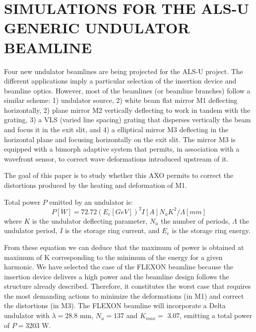 \documentclass[]{spie}  %
\begin{document}
\section{SIMULATIONS FOR THE ALS-U GENERIC UNDULATOR BEAMLINE}
Four new undulator beamlines are being projected for the ALS-U project. The different applications imply a particular selection of the insertion device and beamline optics. However, most of the beamlines (or beamline branches) follow a similar scheme: 1) undulator source, 2) white beam flat mirror M1 deflecting horizontally, 2) plane mirror M2 vertically deflecting to work in tandem with the grating, 3) a VLS (varied line spacing) grating that disperses vertically the beam and focus it in the exit slit, and 4) a elliptical mirror M3 deflecting in the horizontal plane and focusing horizontally on the exit slit. The mirror M3 is equipped with a bimorph adaptive system that permits, in association with a wavefront sensor, to correct wave deformations introduced upstream of it.

The goal of this paper is to study whether this AXO permits to correct the distortions produced by the heating and deformation of M1.

Total power $P$ emitted by an undulator is: 
\begin{equation}
    P [W] = 72.72  (E_e [GeV])^2  I[A]  N_u  K^2 / \Lambda[mm]
\end{equation}
where $K$ is the undulator deflecting parameter, $N_u$ the number of periods, $\Lambda$ the undulator period, $I$ is the storage ring current, and $E_e$ is the storage ring energy. 

From these equation we can deduce that the maximum of power is obtained at maximum of K corresponding to the minimum of the energy for a given harmonic.  We have selected the case of the FLEXON beamline because the insertion device delivers a high power and the beamline design follows the structure already described. Therefore, it constitutes the worst case that requires the most demanding actions to minimize the deformations (in M1) and correct the distortions (in M3). The FLEXON beamline will incorporate a Delta undulator \cite{deltaundulator} with $\lambda=$28.8 mm, $N_u=$137 and $K_{max}=$ 3.07, emitting a total power of $P=$3203 W. 
\end{document}
